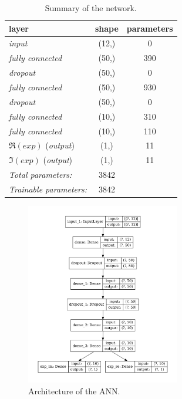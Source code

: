 \begin{table}[htbp]
  \centering
  \begin{tabular}{@{}lcc@{}}
    \toprule
    \textbf{layer}               & \textbf{shape} & \textbf{parameters} \\
    \midrule
    \emph{input}                 & (12,)          & 0                   \\
    \emph{fully connected}       & (50,)          & 390                 \\
    \emph{dropout}               & (50,)          & 0                   \\
    \emph{fully connected}       & (50,)          & 930                 \\
    \emph{dropout}               & (50,)          & 0                   \\
    \emph{fully connected}       & (10,)          & 310                 \\
    \emph{fully connected}       & (10,)          & 110                 \\
    $\Re(exp)$ (\emph{output})   & (1,)           & 11                  \\
    $\Im(exp)$ (\emph{output})   & (1,)           & 11                  \\
    \midrule
    \emph{Total parameters:}     & \num{3842}     &                     \\
    \emph{Trainable parameters:} & \num{3842}     &                     \\
    \bottomrule
  \end{tabular}
  \caption{Summary of the network.}
  \label{tab:agg:keras_summary}
\end{table}

\begin{figure}[htbp]
  \centering
  \includegraphics[width=0.6\textwidth]{img/ann_arch}
  \caption{Architecture of the ANN.}
  \label{fig:agg:arch}
\end{figure}


